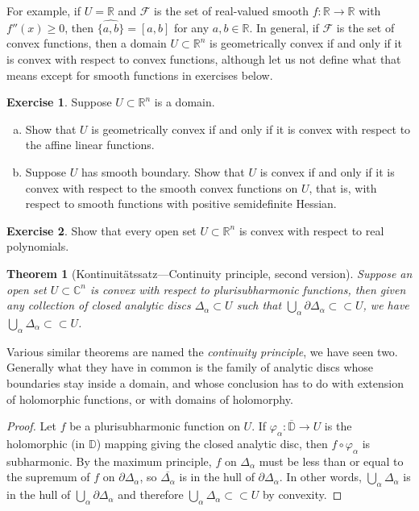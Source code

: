 \documentclass[12pt,openany]{book}
\newcommand{\C}{{\mathbb{C}}}
\newcommand{\R}{{\mathbb{R}}}
\newcommand{\D}{{\mathbb{D}}}
\newcommand{\sF}{{\mathscr{F}}}
\theoremstyle{plain}
\newtheorem{thm}{Theorem}[section]
\theoremstyle{remark}
\theoremstyle{definition}
\newenvironment{exbox}{%
    \def\FrameCommand{\vrule width 1pt \relax\hspace{10pt}}%
    \MakeFramed{\advance\hsize-\width\FrameRestore}%
}{%
    \endMakeFramed
}
\newenvironment{exparts}{%
    \leavevmode\begin{enumerate}[a),noitemsep,topsep=0pt,parsep=0pt,partopsep=0pt]
}{%
    \end{enumerate}
}
\theoremstyle{exercise}
\newtheorem{exercise}{Exercise}[section]
\theoremstyle{example}
\begin{document}
For example, if $U=\R$ and $\sF$ is the set of real-valued smooth
$f \colon \R \to \R$ with $f''(x) \geq 0$, then
$\widehat{\{ a, b \}} = [a,b]$ for any $a,b \in \R$.
In general, if $\sF$ is the set of convex functions, then
a domain $U \subset \R^n$ is geometrically convex if and only if it is
convex with respect to convex functions, although let us not define
what that means except for smooth functions in exercises below.

\begin{exbox}
\begin{exercise} \label{exercise:geomconvexfuncs}
Suppose $U \subset \R^n$ is a domain.
\begin{exparts}
\item
Show that $U$
is geometrically convex if and only if it is
convex with respect to the affine linear functions.
\item
Suppose $U$
has smooth boundary.
Show that $U$ is
convex if and only if it is
convex with respect to the smooth convex functions on $U$,
that is, with respect to smooth functions with positive semidefinite Hessian.
\end{exparts}
\end{exercise}

\begin{exercise}
Show that every open set $U \subset \R^n$ is convex with respect to real
polynomials.
\end{exercise}
\end{exbox}

\begin{thm}[Kontinuit\"atssatz---Continuity
principle, second version]
\label{thm:contprinciple2}
Suppose an open set $U \subset \C^n$ is convex with respect to plurisubharmonic
functions,
then given any collection of closed analytic discs $\Delta_\alpha \subset U$
such that $\bigcup_\alpha \partial \Delta_\alpha \subset \subset U$,
we have
$\bigcup_\alpha \Delta_\alpha \subset \subset U$.
\end{thm}

Various similar theorems are named the \emph{continuity principle},
we have seen two.
Generally what they have in common is the family of analytic discs whose
boundaries stay inside a domain, and whose conclusion has to do
with extension of holomorphic functions, or with domains of holomorphy.

\begin{proof}
Let $f$ be a plurisubharmonic function on $U$.  If $\varphi_\alpha \colon
\overline{\D} \to U$ is the holomorphic (in $\D$) mapping giving the closed
analytic disc, then $f \circ \varphi_\alpha$ is subharmonic.
By the maximum principle,
$f$ on $\Delta_\alpha$ must be less than or equal to the supremum
of $f$ on $\partial \Delta_\alpha$, so $\overline{\Delta_\alpha}$
is in the hull of
$\partial \Delta_\alpha$.
In other words,
$\bigcup_\alpha \Delta_\alpha$ is in the hull of
$\bigcup_\alpha \partial \Delta_\alpha$ and therefore
$\bigcup_\alpha \Delta_\alpha \subset \subset U$ by convexity.
\end{proof}
\end{document}
